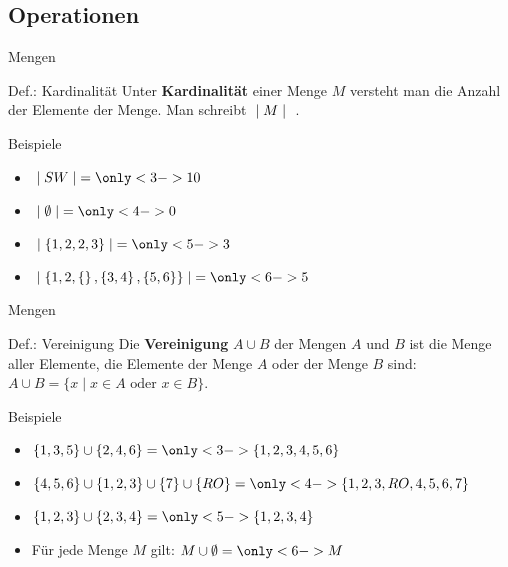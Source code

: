 \subsection{Operationen}
	\begin{frame}{Mengen}
		\begin{block}{Def.: Kardinalität}
			Unter \textbf{Kardinalität} einer Menge $M$ versteht man die Anzahl der Elemente der Menge. Man schreibt $\; \mid M \mid \;$ .
		\end{block}
		\pause
		\begin{exampleblock}{Beispiele}
			\begin{itemize}
				\item $\setsize{SW} = \only<3->{10}$
				\item $\setsize{\emptyset} = \only<4->{0}$
				\item $\setsize{\{1,2,2,3\}} = \only<5->{3}$
				\item $\setsize{\set{1, 2, \set{}, \set{3,4}, \set{5, 6}}} = \only<6->{5}$
			\end{itemize}
		\end{exampleblock}
	\end{frame}

	\begin{frame}{Mengen}
		\begin{block}{Def.: Vereinigung}
			Die \textbf{Vereinigung} $A \cup B$ der Mengen $A$ und $B$ ist die Menge aller Elemente, die Elemente der Menge $A$ oder der Menge $B$ sind: $A \cup B = \{x \mid x \in A \text{ oder } x \in B\}$.
		\end{block}
		\pause
		\begin{exampleblock}{Beispiele}
			\begin{itemize}
				\item $\{1,3,5\}\cup\{2,4,6\} = \only<3->{\{1,2,3,4,5,6\}}$
				\item $\{4,5,6\}\cup\{1,2,3\}\cup\{7\}\cup\{RO\} = \only<4->{\{1,2,3,RO,4,5,6,7\}}$
				\item $\{1,2,3\}\cup\{2,3,4\} = \only<5->{\{1,2,3,4\}}$
				\item Für jede Menge $M$ gilt: $M \cup \emptyset = \only<6->{M}$
			\end{itemize}
		\end{exampleblock}
	\end{frame}

